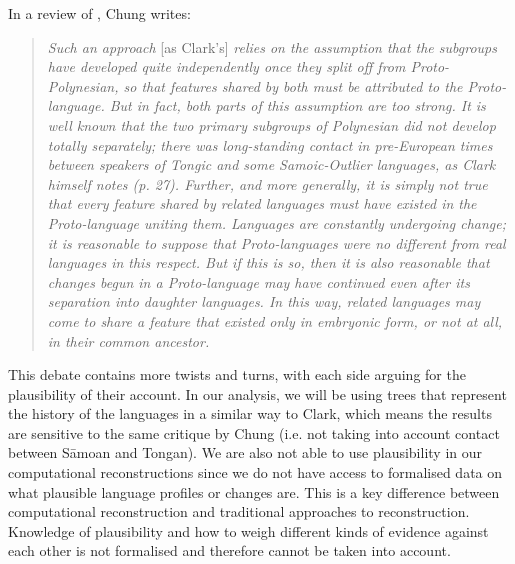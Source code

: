\documentclass[12pt,letterpaper]{article}
\begin{document}
In a review of \citet{clark1973aspects}, Chung writes:

\begin{quotation}
\noindent\emph{Such an approach} [as Clark's] \emph{relies on the assumption that the subgroups have developed quite independently once they split off from Proto-Polynesian, so that features shared by both must be attributed to the Proto-language. But in fact, both parts of this assumption are too strong. It is well known that the two primary subgroups of Polynesian did not develop totally separately; there was long-standing contact in pre-European times between speakers of Tongic and some Samoic-Outlier languages, as Clark himself notes (p. 27). Further, and more generally, it is simply not true that every feature shared by related languages must have existed in the Proto-language uniting them. Languages are constantly undergoing change; it is reasonable to suppose that Proto-languages were no different from real languages in this respect. But if this is so, then it is also reasonable that changes begun in a Proto-language may have continued even after its separation into daughter languages. In this way, related languages may come to share a feature that existed only in embryonic form, or not at all, in their common ancestor.}
\end{quotation}
\begin{flushright} \citet[539]{chung1977aspects}  \end{flushright}

This debate contains more twists and turns, with each side arguing for the plausibility of their account. In our analysis, we will be using trees that represent the history of the languages in a similar way to Clark, which means the results are sensitive to the same critique by Chung (i.e. not taking into account contact between S\={a}moan and Tongan). We are also not able to use plausibility in our computational reconstructions since we do not have access to formalised data on what plausible language profiles or changes are. This is a key difference between computational reconstruction and traditional approaches to reconstruction. Knowledge of plausibility and how to weigh different kinds of evidence against each other is not formalised and therefore cannot be taken into account.

\end{document}
